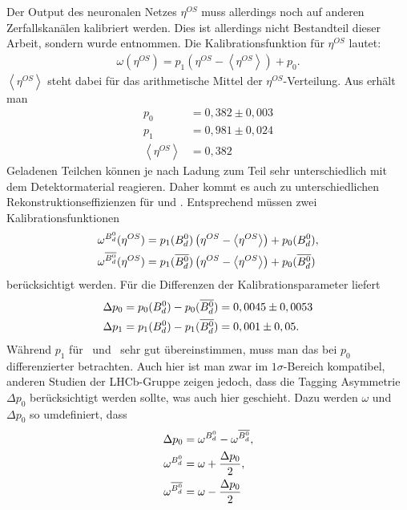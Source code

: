 Der Output des neuronalen Netzes $\eta^{OS}$ muss allerdings noch auf anderen Zerfallskanälen kalibriert werden. Dies ist allerdings nicht Bestandteil dieser Arbeit, sondern wurde \cite{tagging} entnommen. Die Kalibrationsfunktion für $\eta^{OS}$ lautet:
\begin{align}
\omega(\eta^{OS}) = p_1\left(\eta^{OS}-\left\langle \eta^{OS} \right\rangle\right) + p_0 .
\end{align}
$\left\langle \eta^{OS} \right\rangle$ steht dabei für das arithmetische Mittel der $\eta^{OS}$-Verteilung. Aus \cite{tagging} erhält man
\begin{align}
p_0 &= 0,382 \pm 0,003 \\
p_1 &= 0,981 \pm 0,024 \\
\left\langle \eta^{OS} \right\rangle &= 0,382
\end{align}
Geladenen Teilchen können je nach Ladung zum Teil sehr unterschiedlich mit dem Detektormaterial reagieren. Daher kommt es auch zu unterschiedlichen Rekonstruktionseffizienzen für \Bd und \Bdbar. Entsprechend müssen zwei Kalibrationsfunktionen 
\begin{align}
\omega^{\text{$B_d^0$}}(\eta^{OS}) &= p_1(\text{$B_d^0$})\left(\eta^{OS}-\left\langle \eta^{OS} \right\rangle\right) + p_0(\text{$B_d^0$}) , \\
\omega^{\text{$\overline{B_d^0}$}}(\eta^{OS}) &= p_1(\text{$\overline{B_d^0}$})\left(\eta^{OS}-\left\langle \eta^{OS} \right\rangle\right) + p_0(\text{$\overline{B_d^0}$})
\end{align}
berücksichtigt werden. Für die Differenzen der Kalibrationsparameter liefert \cite{tagging}
\begin{align}
\Delta p_0 &= p_0(\text{$B_d^0$}) - p_0(\text{$\overline{B_d^0}$}) = 0,0045 \pm 0,0053 \\
\Delta p_1 &= p_1(\text{$B_d^0$}) - p_1(\text{$\overline{B_d^0}$}) = 0,001 \pm 0,05 .
\end{align}
Während $p_1$ für \Bd\ und \Bdbar\ sehr gut übereinstimmen, muss man das bei $p_0$ differenzierter betrachten. Auch hier ist man zwar im $1\sigma$-Bereich kompatibel, anderen Studien der LHCb-Gruppe zeigen jedoch, dass die Tagging Asymmetrie $\Delta p_0$ berücksichtigt werden sollte, was auch hier geschieht. Dazu werden $\omega$ und $\Delta p_0$ so umdefiniert, dass
\begin{align}
\Delta p_0 &= \omega^{\text{$B_d^0$}} - \omega^{\text{$\overline{B_d^0}$}}, \\
\omega^{\text{$B_d^0$}} &= \omega + \frac{\Delta p_0}{2},  \\
\omega^{\text{$\overline{B_d^0}$}} &= \omega - \frac{\Delta p_0}{2}
\end{align}
